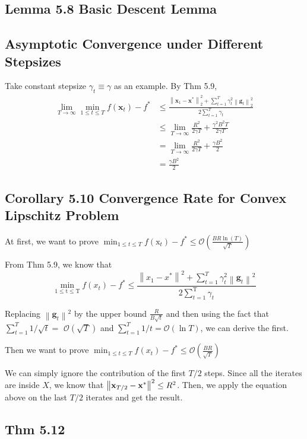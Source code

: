 \subsection*{Lemma 5.8 Basic Descent Lemma}







\subsection*{Asymptotic Convergence under Different Stepsizes}

Take constant stepsize $\gamma_{t} \equiv \gamma$ as an example. By Thm 5.9,
\begin{align*}
    \lim_{T \rightarrow \infty} \min _{1 \leq t \leq T} f\left(\mathbf{x}_{t}\right)-f^{*} &\leq \frac{\left\|\mathbf{x}_{1}-\mathbf{x}^{*}\right\|_{2}^{2}+\sum_{t=1}^{T} \gamma_{t}^{2}\left\|\mathbf{g}_{t}\right\|_{2}^{2}}{2 \sum_{t=1}^{T}  \gamma_{t}} \\
    &\leq \lim_{T \rightarrow \infty} \frac{R^2}{2\gamma T} + \frac{\gamma^2 B^2 T}{2\gamma T}\\
    &= \lim_{T \rightarrow \infty} \frac{R^2}{2\gamma T} + \frac{\gamma B^2}{2}\\
    &= \frac{\gamma B^2}{2} 
\end{align*}






\subsection*{Corollary 5.10 Convergence Rate for Convex Lipschitz Problem}
At first, we want to prove $
\min _{1 \leq {t} \leq {T}} f\left(\mathrm{x}_{{t}}\right)-f^{*} \leq \mathcal{O}\left(\frac{BR \ln ({T})}{\sqrt{{T}}}\right)
$

From Thm 5.9, we know that
$$
\min _{1 \leq \mathrm{t} \leq \mathrm{T}} f\left(x_{t}\right)-f^{*} \leq \frac{\left\|x_{1}-x^{*}\right\|^{2}+\sum_{t=1}^{T} \gamma_{t}^{2}\left\|\mathbf{g}_{t}\right\|^{2}}{2 \sum_{t=1}^{\mathrm{T}} \gamma_{t}}
$$

Replacing $\left\|\boldsymbol{g}_{{t}}\right\|^{2}$ by the upper bound $\frac{{R}}{B \sqrt{t}}$ and then using the fact that $\sum_{t=1}^{{T}} 1 / \sqrt{t}=$ $\mathcal{O}(\sqrt{{T}})$ and $\sum_{t=1}^{T} 1 / {t}=\mathcal{O}(\ln {T})$, we can derive the first.

Then we want to prove $
\min _{1 \leq {t} \leq {T}} f\left(x_{t}\right)-f^{*} \leq 
\mathcal{O}\left(\frac{B R}{\sqrt{T}}\right)
$

We can simply ignore the contribution of the first $T/2$ steps. Since all the iterates are inside $X$, we know that $\left\|\boldsymbol{\mathbf{x}}_{T / 2}-\boldsymbol{\mathbf{x}}^{*}\right\|^{2} \leq R^{2}$. Then, we apply the equation above on the last $T / 2$ iterates and get the result.






\subsection*{Thm 5.12}


